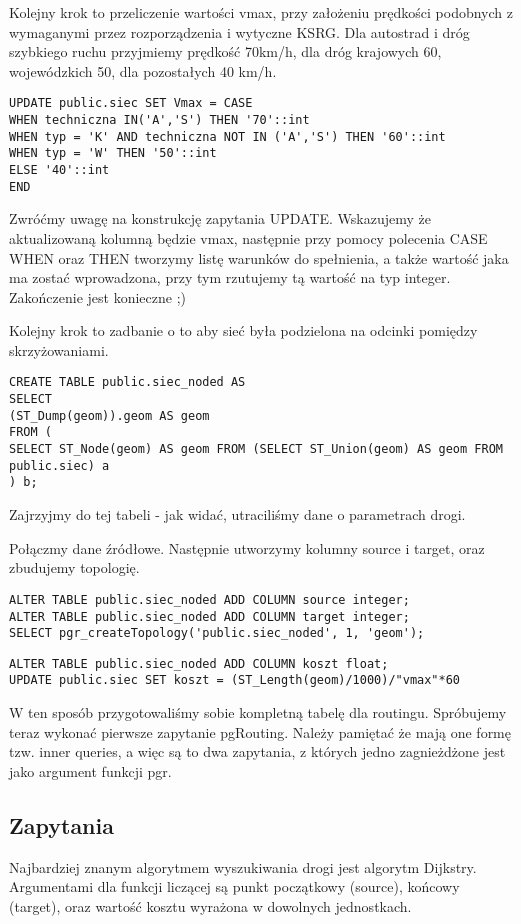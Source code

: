 Kolejny krok to przeliczenie wartości vmax, przy założeniu prędkości podobnych z wymaganymi przez rozporządzenia i wytyczne KSRG. Dla autostrad i dróg szybkiego ruchu przyjmiemy prędkość 70km/h, dla dróg krajowych 60, wojewódzkich 50, dla pozostałych 40 km/h. 
\begin{lstlisting}
UPDATE public.siec SET Vmax = CASE 
WHEN techniczna IN('A','S') THEN '70'::int
WHEN typ = 'K' AND techniczna NOT IN ('A','S') THEN '60'::int
WHEN typ = 'W' THEN '50'::int
ELSE '40'::int
END
\end{lstlisting}
Zwróćmy uwagę na konstrukcję zapytania UPDATE. Wskazujemy że aktualizowaną kolumną będzie vmax, następnie przy pomocy polecenia CASE WHEN oraz THEN tworzymy listę warunków do spełnienia, a także wartość jaka ma zostać wprowadzona, przy tym rzutujemy tą wartość na typ integer. Zakończenie jest konieczne ;)



Kolejny krok to zadbanie o to aby sieć była podzielona na odcinki pomiędzy skrzyżowaniami.
\begin{lstlisting}
CREATE TABLE public.siec_noded AS
SELECT
(ST_Dump(geom)).geom AS geom
FROM (
SELECT ST_Node(geom) AS geom FROM (SELECT ST_Union(geom) AS geom FROM public.siec) a
) b;
\end{lstlisting}

Zajrzyjmy do tej tabeli - jak widać, utraciliśmy dane o parametrach drogi.

Połączmy dane źródłowe.
Następnie utworzymy kolumny source i target, oraz zbudujemy topologię.
\begin{lstlisting}
ALTER TABLE public.siec_noded ADD COLUMN source integer;
ALTER TABLE public.siec_noded ADD COLUMN target integer;
SELECT pgr_createTopology('public.siec_noded', 1, 'geom');
\end{lstlisting}

\begin{lstlisting}
ALTER TABLE public.siec_noded ADD COLUMN koszt float;
UPDATE public.siec SET koszt = (ST_Length(geom)/1000)/"vmax"*60 
\end{lstlisting}

W ten sposób przygotowaliśmy sobie kompletną tabelę dla routingu. Spróbujemy teraz wykonać pierwsze zapytanie pgRouting. Należy pamiętać że mają one formę tzw. inner queries, a więc są to dwa zapytania, z których jedno zagnieżdżone jest jako argument funkcji pgr.
\subsection{Zapytania}
Najbardziej znanym algorytmem wyszukiwania drogi jest algorytm Dijkstry. Argumentami dla funkcji liczącej są punkt początkowy (source), końcowy (target), oraz wartość kosztu wyrażona w dowolnych jednostkach.

